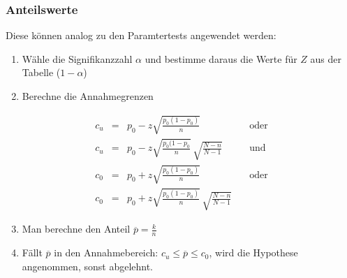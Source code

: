 \subsubsection{Anteilswerte}
Diese können analog zu den Paramtertests angewendet werden:
\begin{enumerate}
\item Wähle die Signifikanzzahl $\alpha$ und bestimme daraus die Werte für $Z$ aus der Tabelle ($1-\alpha$)
\item Berechne die Annahmegrenzen 
\end{enumerate}
\begin{align}
c_u &=& p_0 - z\sqrt{\frac{p_0(1-p_0)}{n}}&\quad\mbox{oder}\\
c_u &=& p_0 - z\sqrt{\frac{p_0(1-p_0}{n}}\,\sqrt{\frac{N-n}{N-1}}&\quad\mbox{und}\\
c_0&=&p_0 + z\sqrt{\frac{p_0(1-p_0)}{n}}&\quad\mbox{oder}\\
c_0&=& p_0 + z \sqrt{\frac{p_0(1-p_0)}{n}}\,\sqrt{\frac{N-n}{N-1}}&
\end{align}
\begin{enumerate}
  \setcounter{enumi}{2}
  \item Man berechne den Anteil $\overline{p}=\frac{k}{n}$
  \item Fällt $\overline{p}$ in den Annahmebereich: $c_u\leq\overline{p}\leq c_0$, wird die Hypothese angenommen, sonst abgelehnt.
\end{enumerate}
